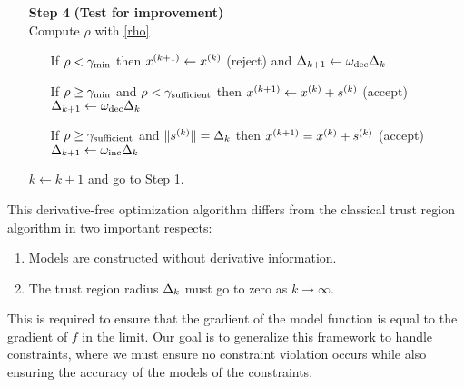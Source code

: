 \begin{algorithm}[H]
\begin{itemize}
        \item[\textbf{Step 4}] \textbf{(Test for improvement)} \\
            Compute $\rho$ with \cref{rho} \begin{itemize}
                \item[] If $\rho < \gamma_{\text{min}}$ then ${x}^{(k+1)} \gets {x^{(k)}}$ (reject) and $\Delta_{k+1} \gets \omega_{\text{dec}}\Delta_{k}$
                \item[] If $\rho \ge \gamma_{\text{min}}$ and $\rho < \gamma_{\text{sufficient}}$ then ${x}^{(k+1)}\gets{x^{(k)}}+{{s}^{(k)}}$ (accept) $\Delta_{k+1} \gets \omega_{\text{dec}}\Delta_{k}$
                \item[] If $\rho \ge \gamma_{\text{sufficient}}$ and $\|{{s}^{(k)}}\| = \Delta_{k}$ then ${x}^{(k+1)}={x^{(k)}}+{{s}^{(k)}}$ (accept) $\Delta_{k+1} \gets \omega_{\text{inc}}\Delta_{k}$
            \end{itemize}
            $k \gets k+1$ and go to Step 1.
    \end{itemize}
\end{algorithm}

This derivative-free optimization algorithm differs from the classical trust region algorithm in two important respects:
\begin{enumerate}
    \item Models are constructed without derivative information.
    \item The trust region radius $\Delta_k$ must go to zero as $k\to\infty$.
\end{enumerate}

This is required to ensure that the gradient of the model function is equal to the gradient of $f$ in the limit.
Our goal is to generalize this framework to handle constraints, where we must ensure no constraint violation occurs while also ensuring the accuracy of the models of the constraints.
% 
%   
  

